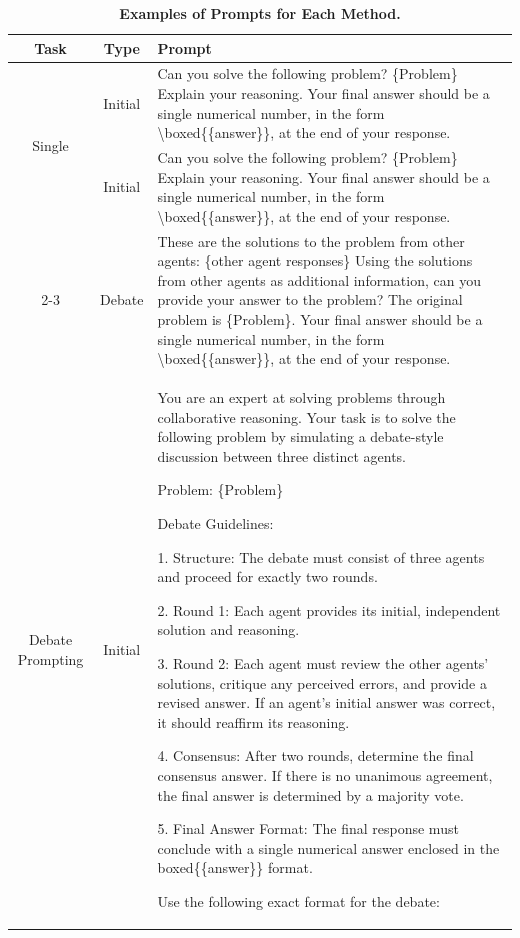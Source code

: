 \begin{table}
\centering
\caption{\textbf{Examples of Prompts for Each Method.}}
\label{tab:prompts}
\begin{tabularx}{\textwidth}{c|c|X}
\textbf{Task} & \textbf{Type} & \textbf{Prompt} \\
\hline
\multirow{2}{*}{Single} & Initial & Can you solve the following problem? \{Problem\} Explain your reasoning. Your final answer should be a single numerical number, in the form \textbackslash boxed\{\{answer\}\}, at the end of your response. \\
\cline{2-3}
\hline
\multirow{2}{*}{Debate} & Initial & Can you solve the following problem? \{Problem\} Explain your reasoning. Your final answer should be a single numerical number, in the form \textbackslash boxed\{\{answer\}\}, at the end of your response. \\
\cline{2-3}
& Debate & These are the solutions to the problem from other agents: \{other agent responses\} Using the solutions from other agents as additional information, can you provide your answer to the problem? The original problem is \{Problem\}. Your final answer should be a single numerical number, in the form \textbackslash boxed\{\{answer\}\}, at the end of your response. \\
\hline
\multirow{2}{*}{Debate Prompting} & Initial & You are an expert at solving problems through collaborative reasoning. Your task is to solve the following problem by simulating a debate-style discussion between three distinct agents.

Problem: \{Problem\}

Debate Guidelines:

1. Structure: The debate must consist of three agents and proceed for exactly two rounds.

2. Round 1: Each agent provides its initial, independent solution and reasoning.

3. Round 2: Each agent must review the other agents' solutions, critique any perceived errors, and provide a revised answer. If an agent's initial answer was correct, it should reaffirm its reasoning.

4. Consensus: After two rounds, determine the final consensus answer. If there is no unanimous agreement, the final answer is determined by a majority vote.

5. Final Answer Format: The final response must conclude with a single numerical answer enclosed in the boxed\{\{answer\}\} format.

Use the following exact format for the debate:


\end{tabularx}
\end{table}

